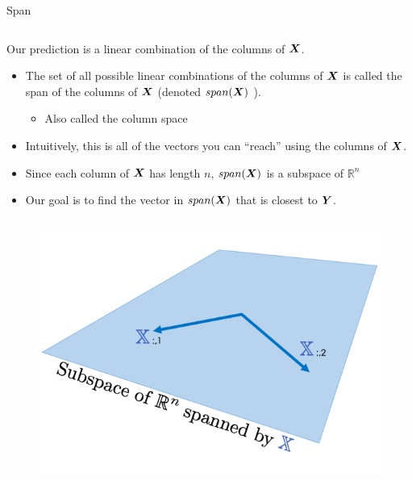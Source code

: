 \documentclass[aspectratio=169]{../latex_main/tntbeamer}  %
\begin{document}
	\begin{frame}{Span}
	    \begin{colums}
	        \begin{column}{.5\textwidth}
	                Our prediction is a linear combination of the columns of $\bm{X}$. 
	                \begin{itemize}
	                    \item The set of all possible linear combinations of the columns of $\bm{X}$ is called the span of the columns of $\bm{X}$ (denoted      $span(\bm{X})$           ).
	                    \begin{itemize}
	                        \item Also called the column space
	                    \end{itemize}
                        \item Intuitively, this is all of the vectors you can “reach” using the columns of $\bm{X}$.
                        \item Since each column of $\bm{X}$ has length $n$, $span(\bm{X})$ is a subspace of $\mathbb{R}^n$    
                        \item Our goal is to find the vector in $span(\bm{X})$ that is closest to  $\bm{Y}$. 
	                \end{itemize}
	        \end{column}
	        \begin{column}{.4\textwidth}
	                \begin{figure}
	                    \includegraphics[scale=.45]{Bild6}
	                \end{figure}
	        \end{column}
	    \end{colums}
	\end{frame}
	 
\end{document}

